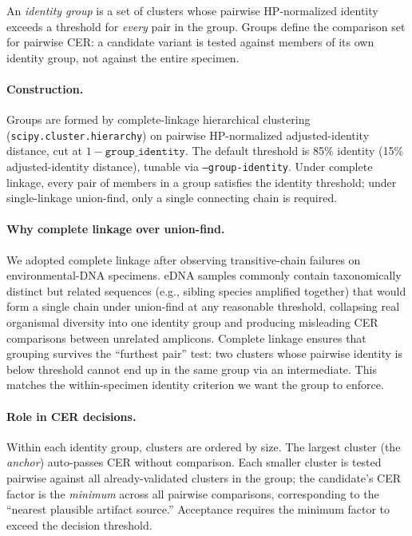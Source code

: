 \documentclass[11pt]{article}
\begin{document}
An \emph{identity group} is a set of clusters whose pairwise HP-normalized
identity exceeds a threshold for \emph{every} pair in the group. Groups define
the comparison set for pairwise CER: a candidate variant is tested against
members of its own identity group, not against the entire specimen.

\paragraph{Construction.} Groups are formed by complete-linkage hierarchical
clustering (\texttt{scipy.cluster.hierarchy}) on pairwise HP-normalized
adjusted-identity distance, cut at $1 - \texttt{group\_identity}$. The default
threshold is 85\% identity (15\% adjusted-identity distance), tunable via
\texttt{--group-identity}. Under complete linkage, every pair of members in a
group satisfies the identity threshold; under single-linkage union-find, only
a single connecting chain is required.

\paragraph{Why complete linkage over union-find.} We adopted complete linkage
after observing transitive-chain failures on environmental-DNA specimens. eDNA
samples commonly contain taxonomically distinct but related sequences (e.g.,
sibling species amplified together) that would form a single chain under
union-find at any reasonable threshold, collapsing real organismal diversity
into one identity group and producing misleading CER comparisons between
unrelated amplicons. Complete linkage ensures that grouping survives the
``furthest pair'' test: two clusters whose pairwise identity is below threshold
cannot end up in the same group via an intermediate. This matches the
within-specimen identity criterion we want the group to enforce.

\paragraph{Role in CER decisions.} Within each identity group, clusters are
ordered by size. The largest cluster (the \emph{anchor}) auto-passes CER
without comparison. Each smaller cluster is tested pairwise against all
already-validated clusters in the group; the candidate's CER factor is the
\emph{minimum} across all pairwise comparisons, corresponding to the
``nearest plausible artifact source.'' Acceptance requires the minimum
factor to exceed the decision threshold.
\end{document}
